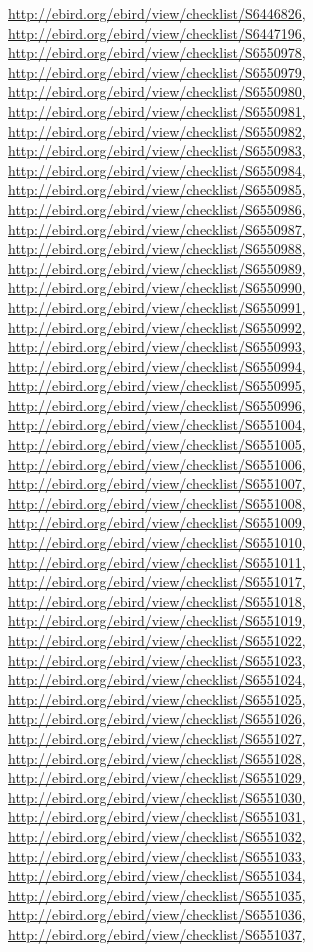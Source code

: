 \documentclass[9pt, article]{memoir}
\begin{document}
\begin{multicols}{2}
\url{http://ebird.org/ebird/view/checklist/S6446826}, 
\url{http://ebird.org/ebird/view/checklist/S6447196}, 
\url{http://ebird.org/ebird/view/checklist/S6550978}, 
\url{http://ebird.org/ebird/view/checklist/S6550979}, 
\url{http://ebird.org/ebird/view/checklist/S6550980}, 
\url{http://ebird.org/ebird/view/checklist/S6550981}, 
\url{http://ebird.org/ebird/view/checklist/S6550982}, 
\url{http://ebird.org/ebird/view/checklist/S6550983}, 
\url{http://ebird.org/ebird/view/checklist/S6550984}, 
\url{http://ebird.org/ebird/view/checklist/S6550985}, 
\url{http://ebird.org/ebird/view/checklist/S6550986}, 
\url{http://ebird.org/ebird/view/checklist/S6550987}, 
\url{http://ebird.org/ebird/view/checklist/S6550988}, 
\url{http://ebird.org/ebird/view/checklist/S6550989}, 
\url{http://ebird.org/ebird/view/checklist/S6550990}, 
\url{http://ebird.org/ebird/view/checklist/S6550991}, 
\url{http://ebird.org/ebird/view/checklist/S6550992}, 
\url{http://ebird.org/ebird/view/checklist/S6550993}, 
\url{http://ebird.org/ebird/view/checklist/S6550994}, 
\url{http://ebird.org/ebird/view/checklist/S6550995}, 
\url{http://ebird.org/ebird/view/checklist/S6550996}, 
\url{http://ebird.org/ebird/view/checklist/S6551004}, 
\url{http://ebird.org/ebird/view/checklist/S6551005}, 
\url{http://ebird.org/ebird/view/checklist/S6551006}, 
\url{http://ebird.org/ebird/view/checklist/S6551007}, 
\url{http://ebird.org/ebird/view/checklist/S6551008}, 
\url{http://ebird.org/ebird/view/checklist/S6551009}, 
\url{http://ebird.org/ebird/view/checklist/S6551010}, 
\url{http://ebird.org/ebird/view/checklist/S6551011}, 
\url{http://ebird.org/ebird/view/checklist/S6551017}, 
\url{http://ebird.org/ebird/view/checklist/S6551018}, 
\url{http://ebird.org/ebird/view/checklist/S6551019}, 
\url{http://ebird.org/ebird/view/checklist/S6551022}, 
\url{http://ebird.org/ebird/view/checklist/S6551023}, 
\url{http://ebird.org/ebird/view/checklist/S6551024}, 
\url{http://ebird.org/ebird/view/checklist/S6551025}, 
\url{http://ebird.org/ebird/view/checklist/S6551026}, 
\url{http://ebird.org/ebird/view/checklist/S6551027}, 
\url{http://ebird.org/ebird/view/checklist/S6551028}, 
\url{http://ebird.org/ebird/view/checklist/S6551029}, 
\url{http://ebird.org/ebird/view/checklist/S6551030}, 
\url{http://ebird.org/ebird/view/checklist/S6551031}, 
\url{http://ebird.org/ebird/view/checklist/S6551032}, 
\url{http://ebird.org/ebird/view/checklist/S6551033}, 
\url{http://ebird.org/ebird/view/checklist/S6551034}, 
\url{http://ebird.org/ebird/view/checklist/S6551035}, 
\url{http://ebird.org/ebird/view/checklist/S6551036}, 
\url{http://ebird.org/ebird/view/checklist/S6551037}, 

\end{multicols}
\end{document}
